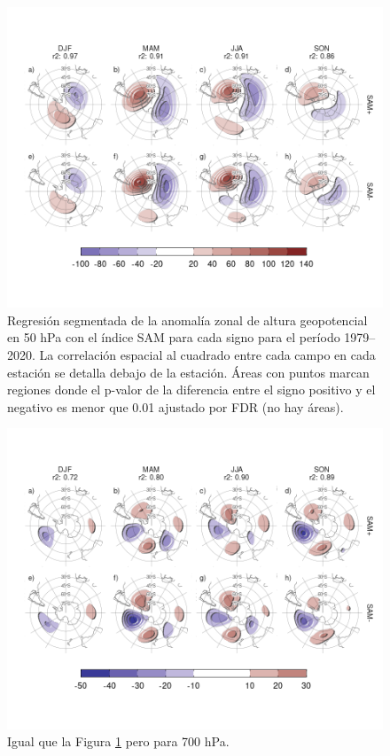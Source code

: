 \documentclass[12pt,oneside]{reedthesis}
\begin{document}
\begin{figure}
\includegraphics{figures/30-sam/sign-regression-50-1} \caption{Regresión segmentada de la anomalía zonal de altura geopotencial en 50 hPa con el índice SAM para cada signo para el período 1979--2020. La correlación espacial al cuadrado entre cada campo en cada estación se detalla debajo de la estación. Áreas con puntos marcan regiones donde el p-valor de la diferencia entre el signo positivo y el negativo es menor que 0.01 ajustado por FDR (no hay áreas).}\label{fig:sign-regression-50}
\end{figure}



\begin{figure}
\includegraphics{figures/30-sam/sign-regression-700-1} \caption{Igual que la Figura \ref{fig:sign-regression-50} pero para 700 hPa.}\label{fig:sign-regression-700}
\end{figure}
\end{document}
